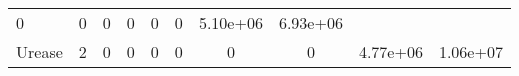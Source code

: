 \documentclass[]{article}
\begin{document}
\begin{longtable}[]{@{}lccccccccc@{}}
\begin{minipage}[t]{0.08\columnwidth}
0\strut
\end{minipage} & \begin{minipage}[t]{0.08\columnwidth}\centering\strut
0\strut
\end{minipage} & \begin{minipage}[t]{0.08\columnwidth}\centering\strut
0\strut
\end{minipage} & \begin{minipage}[t]{0.08\columnwidth}\centering\strut
0\strut
\end{minipage} & \begin{minipage}[t]{0.08\columnwidth}\centering\strut
0\strut
\end{minipage} & \begin{minipage}[t]{0.08\columnwidth}\centering\strut
0\strut
\end{minipage} & \begin{minipage}[t]{0.08\columnwidth}\centering\strut
5.10e+06\strut
\end{minipage} & \begin{minipage}[t]{0.08\columnwidth}\centering\strut
6.93e+06\strut
\end{minipage}\tabularnewline
\begin{minipage}[t]{0.07\columnwidth}\raggedright\strut
Urease\strut
\end{minipage} & \begin{minipage}[t]{0.06\columnwidth}\centering\strut
2\strut
\end{minipage} & \begin{minipage}[t]{0.08\columnwidth}\centering\strut
0\strut
\end{minipage} & \begin{minipage}[t]{0.08\columnwidth}\centering\strut
0\strut
\end{minipage} & \begin{minipage}[t]{0.08\columnwidth}\centering\strut
0\strut
\end{minipage} & \begin{minipage}[t]{0.08\columnwidth}\centering\strut
0\strut
\end{minipage} & \begin{minipage}[t]{0.08\columnwidth}\centering\strut
0\strut
\end{minipage} & \begin{minipage}[t]{0.08\columnwidth}\centering\strut
0\strut
\end{minipage} & \begin{minipage}[t]{0.08\columnwidth}\centering\strut
4.77e+06\strut
\end{minipage} & \begin{minipage}[t]{0.08\columnwidth}\centering\strut
1.06e+07\strut
\end{minipage}\tabularnewline
\bottomrule
\end{longtable}
\end{document}
